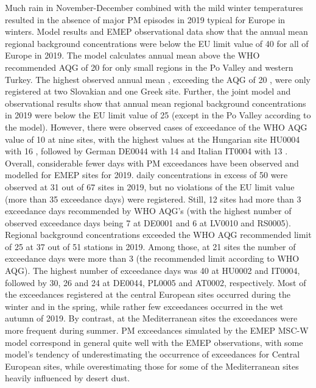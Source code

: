 Much rain in November-December combined with the mild winter temperatures resulted in the absence of major PM episodes in 2019 typical for Europe in winters. Model results and EMEP observational data show that the annual mean regional background \PM[10] concentrations were below the EU limit value of 40 \ug for all of Europe in 2019. The model calculates annual mean \PM[10] above the WHO recommended AQG of 20 \ug for only small regions in the Po Valley and western Turkey. The highest observed annual mean \PM[10], exceeding the AQG of 20 \ug, were only registered at two Slovakian and one Greek site. Further, the joint model and observational results show that annual mean regional background \PM[2.5] concentrations in 2019 were below the EU limit value of 25 \ug (except in the Po Valley according to the model). However, there were observed cases of exceedance of the WHO AQG value of 10 \ug at nine sites, with the highest values at the Hungarian site HU0004 with 16 \ug, followed by German DE0044 with 14 \ug and Italian IT0004 with 13 \ug. Overall, considerable fewer days with PM exceedances have been observed and modelled for EMEP sites for 2019. \PM[10] daily concentrations in excess of 50 \ug were observed at 31 out of 67 sites in 2019, but no violations of the \PM[10] EU limit value (more than 35 exceedance days) were registered. Still, 12 sites had more than 3 exceedance days recommended by WHO AQG’s (with the highest number of observed exceedance days being 7 at DE0001 and 6 at LV0010 and RS0005). Regional background \PM[2.5] concentrations exceeded the WHO AQG recommended limit of 25 \ug at 37 out of 51 stations in 2019. Among those, at 21 sites the number of exceedance days were more than 3 (the recommended limit according to WHO AQG).  The highest number of exceedance days was 40 at HU0002 and IT0004, followed by 30, 26 and 24 at DE0044, PL0005 and AT0002, respectively. Most of the exceedances registered at the central European sites occurred during the winter and in the spring, while rather few exceedances occurred in the wet autumn of 2019. By contrast, at the Mediterranean sites the exceedances were more frequent during summer. PM exceedances simulated by the EMEP MSC-W model correspond in general quite well with the EMEP observations, with some model’s tendency of underestimating the occurrence of exceedances for Central European sites, while overestimating those for some of the Mediterranean sites heavily influenced by desert dust.



